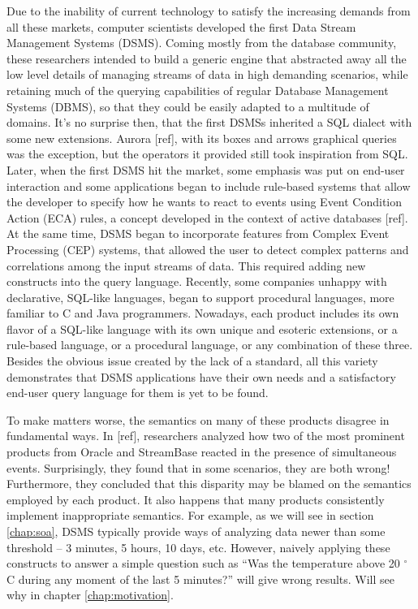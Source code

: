 \documentclass{report}
\begin{document}
Due to the inability of current technology to satisfy the increasing
demands from all these markets, computer scientists developed the
first Data Stream Management Systems (DSMS). Coming mostly from the
database community, these researchers intended to build a generic
engine that abstracted away all the low level details of managing
streams of data in high demanding scenarios, while retaining much of
the querying capabilities of regular Database Management Systems
(DBMS), so that they could be easily adapted to a multitude of
domains. It's no surprise then, that the first DSMSs inherited a SQL
dialect with some new extensions. Aurora [ref], with its boxes and
arrows graphical queries was the exception, but the operators it
provided still took inspiration from SQL. Later, when the first DSMS
hit the market, some emphasis was put on end-user interaction and some
applications began to include rule-based systems that allow the
developer to specify how he wants to react to events using Event
Condition Action (ECA) rules, a concept developed in the context of
active databases [ref]. At the same time, DSMS began to incorporate
features from Complex Event Processing (CEP) systems, that allowed the
user to detect complex patterns and correlations among the input
streams of data. This required adding new constructs into the query
language. Recently, some companies unhappy with declarative, SQL-like
languages, began to support procedural languages, more familiar to C
and Java programmers. Nowadays, each product includes its own flavor
of a SQL-like language with its own unique and esoteric extensions, or
a rule-based language, or a procedural language, or any combination of
these three. Besides the obvious issue created by the lack of a
standard, all this variety demonstrates that DSMS applications have
their own needs and a satisfactory end-user query language for them is
yet to be found.

To make matters worse, the semantics on many of these products
disagree in fundamental ways. In [ref], researchers analyzed how two
of the most prominent products from Oracle and StreamBase reacted in
the presence of simultaneous events. Surprisingly, they found that in
some scenarios, they are both wrong! Furthermore, they concluded that
this disparity may be blamed on the semantics employed by each
product. It also happens that many products consistently implement
inappropriate semantics. For example, as we will see in section
\ref{chap:soa}, DSMS typically provide ways of analyzing data newer
than some threshold -- 3 minutes, 5 hours, 10 days, etc. However,
naively applying these constructs to answer a simple question such as
``Was the temperature above 20 $^{\circ}$C during any moment of the
last 5 minutes?'' will give wrong results. Will see why in chapter
\ref{chap:motivation}.
\end{document}
